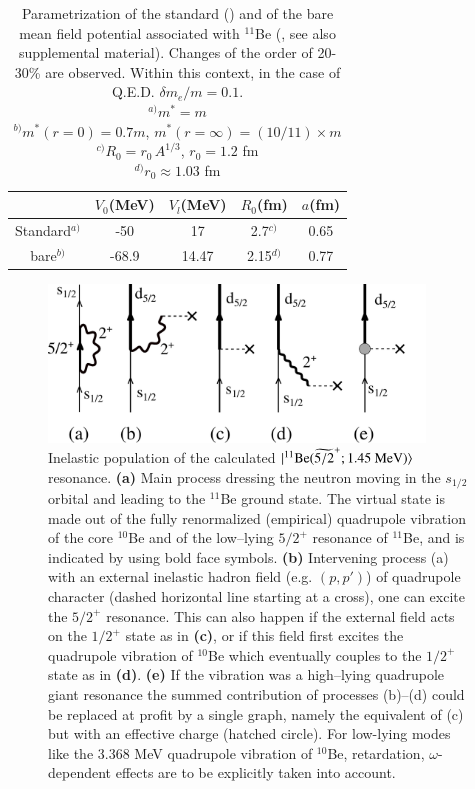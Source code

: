 \begin{table}
	\begin{center}
		\begin{tabular}{|c|c|c|c|c|}
			\hline
			& $V_0$(MeV)  & $V_l$(MeV)  & $R_0$(fm) & $a$(fm)  \\ 
			\hline 
			Standard$^{a)}$  & -50  & 17  & 2.7$^{c)}$ & 0.65  \\ 
			\hline 
			bare$^{b)}$  & -68.9  & 14.47  & 2.15$^{d)}$ & 0.77  \\ 
			\hline 
		\end{tabular}
	\end{center}
	\caption{Parametrization of the standard (\cite{Bohr:69}) and of the bare mean field potential associated with $^{11}$Be (\cite{Barranco:17}, see also supplemental material). Changes of the order of 20-30\% are observed. Within this context, in the case of Q.E.D. $\delta m_e/m=0.1$.\\$^{a)} m^*=m$\\ $^{b)} m^*(r=0)=0.7m$, $m^*(r=\infty)=(10/11)\times m$\\ $^{c)} R_0=r_0\,A^{1/3}$, $r_0=1.2$ fm\\
		$^{d)} r_0\approx1.03$ fm\\ }\label{tab6.6.1}
\end{table} 

\begin{figure}
	\centerline{\includegraphics*[width=10cm,angle=0]{C8/figsC8/fig6_6_1}}
	\caption{Inelastic population of the calculated $|{^{11}\text{Be}(\widetilde{5/2}^+; 1.45\text{ MeV})} \rangle$   resonance. \textbf{(a)} Main process dressing the neutron moving in the $s_{1/2}$ orbital and leading to the $^{11}$Be ground state. The virtual state is made out of the fully renormalized (empirical) quadrupole vibration of the core $^{10}$Be and of the low--lying $5/2^+$ resonance of $^{11}$Be, and is indicated by using bold face symbols. \textbf{(b)} Intervening process (a) with an external inelastic hadron field (e.g. $(p,p')$) of quadrupole character (dashed horizontal line starting at a cross), one can excite the $5/2^+$ resonance. This can also happen if the external field acts on the $1/2^+$ state as in \textbf{(c)}, or if this  field first excites the quadrupole vibration of  $^{10}$Be which eventually couples to the $1/2^+$ state as in \textbf{(d)}. \textbf{(e)} If the vibration was a high--lying quadrupole giant resonance the summed contribution of processes {(b)}--{(d)} could be replaced at profit by a single graph, namely the equivalent of (c) but with an effective charge (hatched circle). For low-lying modes like the 3.368 MeV quadrupole vibration of $^{10}$Be, retardation, $\omega$-dependent effects are to be explicitly taken into account.}\label{fig6.6.1}
\end{figure}

